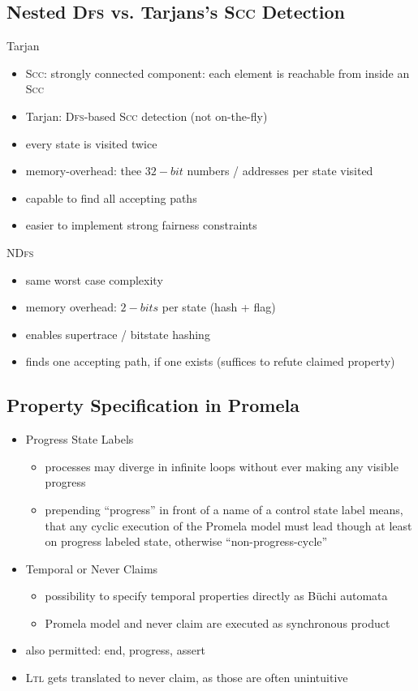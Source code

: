 \documentclass[a4paper, 10pt]{article}
\begin{document}
\subsection*{Nested \textsc{Dfs} vs. Tarjans's \textsc{Scc} Detection}
\begin{minipage}[t]{0.48\textwidth}
Tarjan
\begin{itemize}
    \item \textsc{Scc}: strongly connected component: each element is reachable from inside an \textsc{Scc}
    \item Tarjan: \textsc{Dfs}-based \textsc{Scc} detection (not on-the-fly)
    \item every state is visited twice
    \item memory-overhead: thee $32-bit$ numbers / addresses per state visited
    \item capable to find all accepting paths
    \item easier to implement strong fairness constraints
\end{itemize}
\end{minipage}
\hfill \vrule \hfill
\begin{minipage}{0.48\textwidth}
\textsc{NDfs}
\begin{itemize}
    \item same worst case complexity
    \item memory overhead: $2-bits$ per state (hash + flag)
    \item enables supertrace / bitstate hashing
    \item finds one accepting path, if one exists (suffices to refute claimed property)
\end{itemize}
\end{minipage}
\subsection*{Property Specification in Promela}
\begin{itemize}
    \item Progress State Labels
    \begin{itemize}
        \item processes may diverge in infinite loops without ever making any visible progress
        \item prepending ``progress'' in front of a name of a control state label means, that any cyclic execution of the Promela model must lead though at least on progress labeled state, otherwise ``non-progress-cycle''
    \end{itemize}
    \item Temporal or Never Claims
    \begin{itemize}
        \item possibility to specify temporal properties directly as Büchi automata
        \item Promela model and never claim are executed as synchronous product
    \end{itemize}
    \item also permitted: end, progress, assert
    \item \textsc{Ltl} gets translated to never claim, as those are often unintuitive
\end{itemize}
\end{document}
